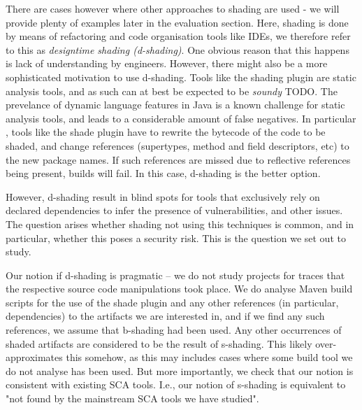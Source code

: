 \documentclass{article}
\begin{document}
 There are cases however where other approaches to shading are used - we will provide plenty of examples later in the evaluation section. Here, shading is done by means of refactoring and code organisation tools like IDEs, we therefore refer to this as \textit{designtime shading (d-shading)}. One obvious reason that this happens is lack of understanding by engineers.  However, there might also be a more sophisticated motivation to use d-shading. Tools like the shading plugin are static analysis tools, and as such can at best be expected to be \textit{soundy} TODO. The prevelance of dynamic language features in Java is a known challenge for static analysis tools, and leads to a considerable amount of false negatives. In particular , tools like the shade plugin have to rewrite the bytecode of the code to be shaded, and change references (supertypes, method and field descriptors, etc) to the new package names. If such references are missed due to reflective references being present, builds will fail. In this case, d-shading is the better option. 
 
 However, d-shading result in blind spots for tools that exclusively rely on declared dependencies to infer the presence of vulnerabilities, and other issues. The question arises whether shading not using this techniques is common, and in particular, whether this poses a security risk. This is the question we set out to study.  
 
 
 Our notion if d-shading is pragmatic -- we do not study projects for traces that the respective source code manipulations took place. We do  analyse Maven build scripts for the use of the shade plugin and any other references (in particular, dependencies) to the artifacts we are interested in, and if we find any such references, we assume that b-shading had been used.  Any other occurrences of shaded artifacts are considered to be the result of s-shading. This likely over-approximates this somehow, as this may includes cases where some build tool we do not analyse has been used. But more importantly, we check that our notion is consistent with existing SCA tools. I.e., our notion of s-shading is equivalent to "not found by the mainstream SCA tools we have studied". 
 
 
 
 
 
 
\end{document}
